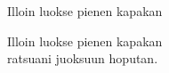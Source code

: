 \begin{song}{Illoin luokse pienen kapakan}

	
	Illoin luokse pienen kapakan\\
    ratsuani juoksuun hoputan.
	
\end{song}